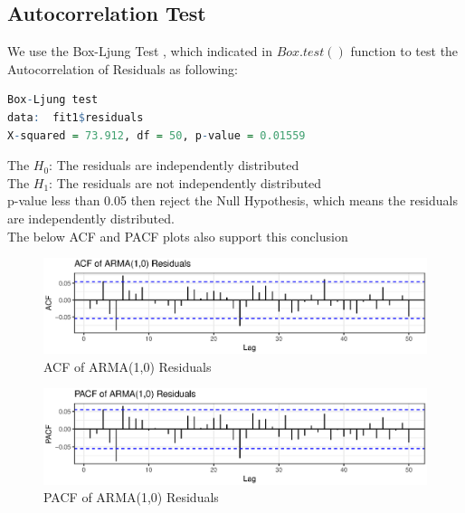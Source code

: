 \subsection{Autocorrelation Test}
We use the Box-Ljung Test \cite{box1970distribution,ljung1978measure}, which indicated in $Box.test()$ function to test the Autocorrelation of Residuals as following:
\begin{lstlisting}[language=R, caption=Box-Ljung test]
Box-Ljung test
data:  fit1$residuals
X-squared = 73.912, df = 50, p-value = 0.01559
\end{lstlisting}
The $H_0$: The residuals are independently distributed \\
The $H_1$: The residuals are not independently distributed \\
p-value less than 0.05 then reject the Null Hypothesis, which means the residuals are independently distributed.\\
The below ACF and PACF plots also support this conclusion
\FloatBarrier
\begin{figure}[!htbp]
  \centering
  \includegraphics[width=\textwidth]{img/Fig12.eps}
  \caption{ACF of ARMA(1,0) Residuals}
\end{figure}
\FloatBarrier
\FloatBarrier
\begin{figure}[!htbp]
  \centering
  \includegraphics[width=\textwidth]{img/Fig13.eps}
  \caption{PACF of ARMA(1,0) Residuals}
\end{figure}
\FloatBarrier

